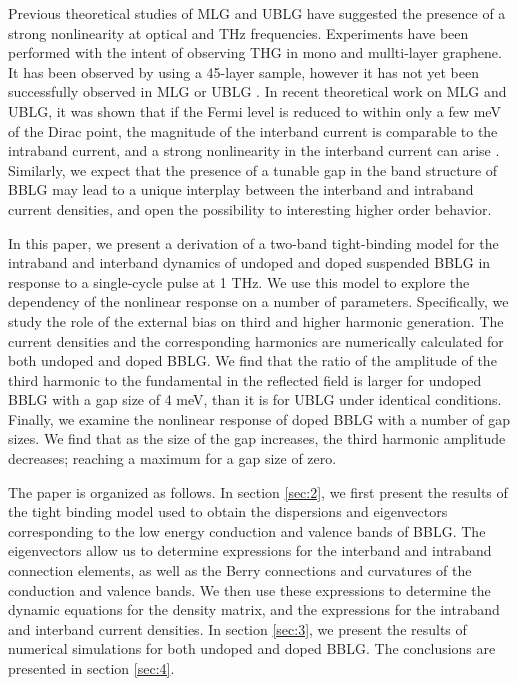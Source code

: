 \documentclass[twocolumn,secnumarabic,amssymb, nobibnotes, aps, prd, superscriptaddress]{revtex4-1}
\begin{document}
Previous theoretical studies of MLG and UBLG have suggested the presence of a strong nonlinearity at optical and THz frequencies\cite{mikhailov2007non, mikhailovnonlin2009, hendry2010coherent, ishikawa2010nonlinear, wright2009strong, ang2010nonlinear}. Experiments have been performed with the intent of observing THG in mono and mullti-layer graphene. It has been observed by using a 45-layer sample, however it has not yet been successfully observed in MLG or UBLG \cite{bowlan2014ultrafast, paul2013high}. In recent theoretical work on MLG and UBLG, it was shown that if the Fermi level is reduced to within only a few meV of the Dirac point, the magnitude of the interband current is comparable to the intraband current, and a strong nonlinearity in the interband current can arise \cite{al2014high, mcgouran2016nonlinear}. Similarly, we expect that the presence of a tunable gap in the band structure of BBLG may lead to a unique interplay between the interband and intraband current densities, and open the possibility to interesting higher order behavior. 


In this paper, we present a derivation of a two-band tight-binding model for the intraband and interband dynamics of undoped and doped suspended BBLG in response to a single-cycle pulse at 1 THz.  We use this model to explore the dependency of the nonlinear response on a number of parameters. Specifically, we study the role of the external bias on third and higher harmonic generation. The current densities and the corresponding harmonics are numerically calculated for both undoped and doped BBLG. We find that the ratio of the amplitude of the third harmonic to the fundamental in the reflected field is larger for undoped BBLG with a gap size of 4 meV, than it is for UBLG under identical conditions. Finally, we examine the nonlinear response of doped BBLG with a number of gap sizes. We find that as the size of the gap increases, the third harmonic amplitude decreases; reaching a maximum for a gap size of zero.

The paper is organized as follows. In section \ref{sec:2},  we first present the results of the tight binding model used to obtain the dispersions and eigenvectors corresponding to the low energy conduction and valence bands of BBLG. The eigenvectors allow us to determine expressions for the interband and intraband connection elements, as well as the Berry connections and curvatures of the conduction and valence bands. We then use these expressions to determine the dynamic equations for the density matrix, and the expressions for the intraband and interband current densities. In section \ref{sec:3}, we present the results of numerical simulations for both undoped and doped BBLG. The conclusions are presented in section \ref{sec:4}.
 
\end{document}
